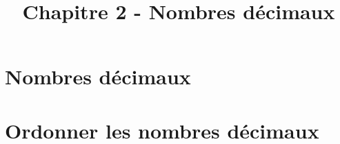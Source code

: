 \title{\vspace{-3em}Chapitre 2 - Nombres décimaux \vspace{-4em}}
\date{ }
\maketitle



\section{Nombres décimaux}

 

\section{Ordonner les nombres décimaux}



%

